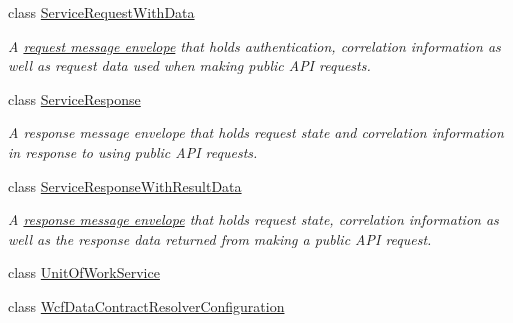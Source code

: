 \begin{DoxyCompactItemize}
class \hyperlink{classCqrs_1_1Services_1_1ServiceRequestWithData}{Service\+Request\+With\+Data}
\begin{DoxyCompactList}\small\item\em A \hyperlink{}{request message envelope} that holds authentication, correlation information as well as request data used when making public A\+PI requests. \end{DoxyCompactList}\item 
class \hyperlink{classCqrs_1_1Services_1_1ServiceResponse}{Service\+Response}
\begin{DoxyCompactList}\small\item\em A response message envelope that holds request state and correlation information in response to using public A\+PI requests. \end{DoxyCompactList}\item 
class \hyperlink{classCqrs_1_1Services_1_1ServiceResponseWithResultData}{Service\+Response\+With\+Result\+Data}
\begin{DoxyCompactList}\small\item\em A \hyperlink{interfaceCqrs_1_1Services_1_1IServiceResponse}{response message envelope} that holds request state, correlation information as well as the response data returned from making a public A\+PI request. \end{DoxyCompactList}\item 
class \hyperlink{classCqrs_1_1Services_1_1UnitOfWorkService}{Unit\+Of\+Work\+Service}
\item 
class \hyperlink{classCqrs_1_1Services_1_1WcfDataContractResolverConfiguration}{Wcf\+Data\+Contract\+Resolver\+Configuration}
\end{DoxyCompactItemize}
